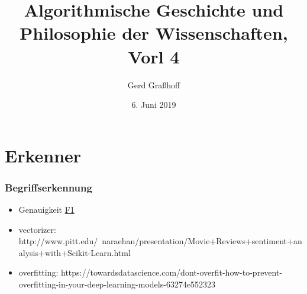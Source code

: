 \documentclass[11pt]{beamer}
\author{Gerd Graßhoff}
\title{Algorithmische Geschichte und Philosophie der Wissenschaften, Vorl 4}
\date{6. Juni 2019}
\begin{document}
	\begin{frame}[plain]
		\maketitle
	\end{frame}
	

\section{Erkenner}

	\begin{frame}
	\frametitle{Begriffserkennung}
	\begin{itemize}
		\item Genauigkeit \href{https://en.wikipedia.org/wiki/F1_score}{F1}
		\item vectorizer: http://www.pitt.edu/~naraehan/presentation/Movie+Reviews+sentiment+analysis+with+Scikit-Learn.html
		\item overfitting: https://towardsdatascience.com/dont-overfit-how-to-prevent-overfitting-in-your-deep-learning-models-63274e552323
	\end{itemize}
\end{frame}
\end{document}
